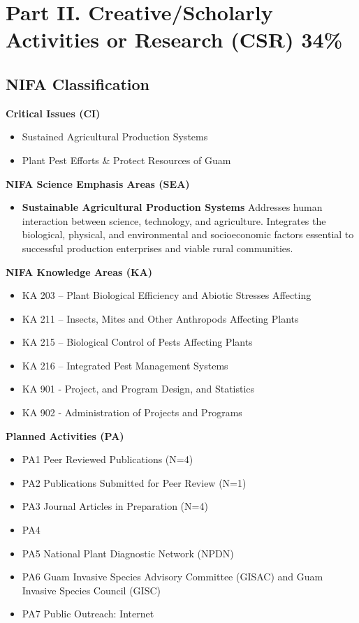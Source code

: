 \newpage
\section{Part II. Creative/Scholarly Activities or Research (CSR) 34\%}

\subsection{NIFA Classification}

\textbf{Critical Issues (CI)}
\begin{itemize}
	\item Sustained Agricultural Production Systems
	\item Plant Pest Efforts \& Protect Resources of Guam
\end{itemize}

\textbf{NIFA Science Emphasis Areas (SEA)}
\begin{itemize}
	\item \textbf{Sustainable Agricultural Production Systems} Addresses human interaction between science, technology, and agriculture. Integrates the biological, physical, and environmental and socioeconomic factors essential to successful production enterprises and viable rural communities. 
\end{itemize}

\textbf{NIFA Knowledge Areas (KA)}
\begin{itemize}
	\item KA 203 – Plant Biological Efficiency and Abiotic Stresses Affecting
	\item KA 211 – Insects, Mites and Other Anthropods Affecting Plants
	\item KA 215 – Biological Control of Pests Affecting Plants
	\item KA 216 – Integrated Pest Management Systems
	\item KA 901 - Project, and Program Design, and Statistics
	\item KA 902 - Administration of Projects and Programs
\end{itemize}

\textbf{Planned Activities (PA)}
\begin{itemize}
	\item PA1 Peer Reviewed Publications (N=4)
	\item PA2 Publications Submitted for Peer Review (N=1)
	\item PA3 Journal Articles in Preparation (N=4)
	\item PA4 
	\item PA5 National Plant Diagnostic Network (NPDN)
	\item PA6 Guam Invasive Species Advisory Committee (GISAC) and Guam Invasive Species Council (GISC)
	\item PA7 Public Outreach: Internet
\end{itemize}


